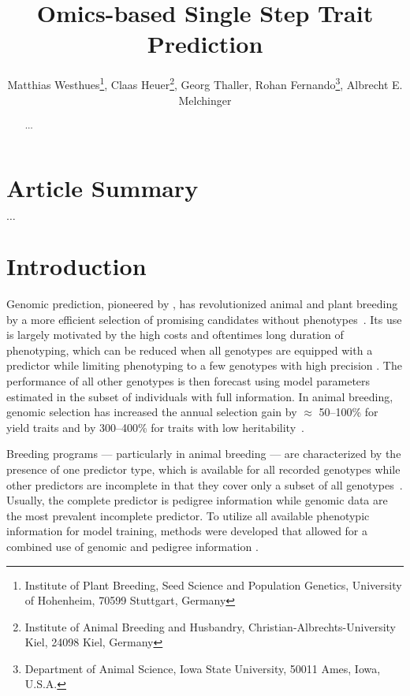 \documentclass[12pt,titlepage]{article}
\title{Omics-based Single Step Trait Prediction}
\author{
  Matthias Westhues\thanks{Institute of Plant Breeding, Seed Science and Population Genetics, University of Hohenheim, 70599 Stuttgart, Germany},
  Claas Heuer\thanks{Institute of Animal Breeding and Husbandry, Christian-Albrechts-University Kiel, 24098 Kiel, Germany},
  Georg Thaller\samethanks[2],
  Rohan Fernando\thanks{Department of Animal Science, Iowa State University, 50011 Ames, Iowa, U.S.A.},
  Albrecht E. Melchinger\samethanks[1]
}
\begin{document}
\maketitle
\doublespacing
\linenumbers



\begin{abstract}

  $\dots$

\end{abstract}



\section{Article Summary}
$\dots$



\section{Introduction}
Genomic prediction, pioneered by , has revolutionized
animal and plant breeding by a more efficient selection of promising candidates 
without phenotypes~\cite{DeLosCampos2013,Garcia-Ruiz2016}.
Its use is largely motivated by the high costs and oftentimes long duration of 
phenotyping, which can be reduced when all genotypes are equipped with a predictor 
while limiting phenotyping to a few genotypes with high precision
\cite{Kadam2016}.
The performance of all other genotypes is then forecast using model parameters
estimated in the subset of individuals with full information.
In animal breeding, genomic selection has increased the annual selection gain 
by $\approx$ 50--100\% for yield traits and by 300--400\% for traits with low 
heritability~\cite{Garcia-Ruiz2016}.

Breeding programs --- particularly in animal breeding --- are characterized by
the presence of one predictor type, which is available for all recorded
genotypes while other predictors are incomplete in that they cover only a 
subset of all genotypes~\cite{Fragomeni2015}.
Usually, the complete predictor is pedigree information while genomic data are
the most prevalent incomplete predictor.
To utilize all available phenotypic information for model training, methods were 
developed that allowed for a combined use of genomic and pedigree information 
\cite{Hayes2009a,VanRaden2009}.
\end{document}
